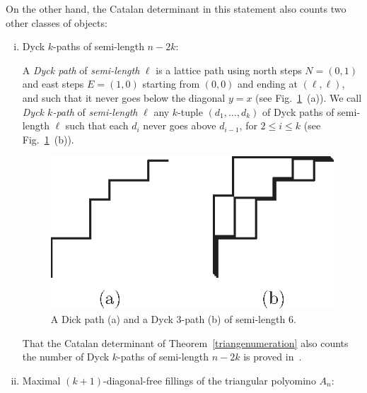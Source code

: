 \documentclass[12pt]{amsart}
\begin{document}
On the other hand, the Catalan determinant in this statement also counts two other classes of objects:
\begin{enumerate}[(i)]
\item Dyck $k$-paths of semi-length $n-2k$:

A \emph{Dyck path} of \emph{semi-length} $\ell$ is a lattice path using north steps $N=(0,1)$ and east steps $E=(1,0)$ starting from $(0,0)$ and ending at $(\ell,\ell)$, and such that it never goes below the diagonal $y=x$ (see Fig.~\ref{dyck}~(a)). We call \emph{Dyck $k$-path} of \emph{semi-length} $\ell$ any $k$-tuple $(d_1,\ldots,d_k)$ of Dyck paths of semi-length $\ell$ such that each $d_i$ never goes above $d_{i-1}$, for $2\le i\le k$ (see Fig.~\ref{dyck}~(b)).

\begin{figure}
\centerline{\includegraphics[scale=1]{dyck.eps}}
\caption{\small{A Dick path (a) and a Dyck $3$-path (b) of semi-length $6$.}}\label{dyck}
\end{figure}

That the Catalan determinant of Theorem~\ref{triangenumeration} also counts the number of Dyck $k$-paths of semi-length $n-2k$ is proved in~\cite{dcv-ecytbh-86}.

\medskip

\item Maximal $(k+1)$-diagonal-free fillings of the triangular polyomino $A_n$:


\end{enumerate}
\end{document}
